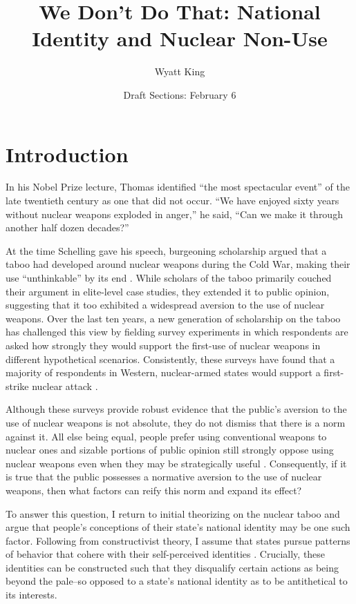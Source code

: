 \documentclass[12pt]{article}
\title{We Don't Do That: National Identity and Nuclear Non-Use}
\author{Wyatt King}
\date{Draft Sections: February 6}
\begin{document}
\maketitle


\section{Introduction}
In his Nobel Prize lecture, Thomas \citet{schelling_astonishing_2006} identified “the most spectacular event” of the late twentieth century as one that did not occur. “We have enjoyed sixty years without nuclear weapons exploded in anger,” he said, “Can we make it through another half dozen decades?”

At the time Schelling gave his speech, burgeoning scholarship argued that a taboo had developed around nuclear weapons during the Cold War, making their use “unthinkable” by its end \citep{tannenwald_stigmatizing_2005, paul_nuclear_1995}. While scholars of the taboo primarily couched their argument in elite-level case studies, they extended it to public opinion, suggesting that it too exhibited a widespread aversion to the use of nuclear weapons. Over the last ten years, a new generation of scholarship on the taboo has challenged this view by fielding survey experiments in which respondents are asked how strongly they would support the first-use of nuclear weapons in different hypothetical scenarios. Consistently, these surveys have found that a majority of respondents in Western, nuclear-armed states would support a first-strike nuclear attack \citep{sagan_revisiting_2017, haworth_what_2019,allison_under_2022, dill_kettles_2022}.

Although these surveys provide robust evidence that the public's aversion to the use of nuclear weapons is not absolute, they do not dismiss that there is a norm against it. All else being equal, people prefer using conventional weapons to nuclear ones and sizable portions of public opinion still strongly oppose using nuclear weapons even when they may be strategically useful \citep{press_atomic_2013}. Consequently, if it is true that the public possesses a normative aversion to the use of nuclear weapons, then what factors can reify this norm and expand its effect?

To answer this question, I return to initial theorizing on the nuclear taboo and argue that people's conceptions of their state's national identity may be one such factor. Following from constructivist theory, I assume that states pursue patterns of behavior that cohere with their self-perceived identities \citep{tannewald_nuclear_2007,wendt_social_1999}. Crucially, these identities can be constructed such that they disqualify certain actions as being beyond the pale--so opposed to a state's national identity as to be antithetical to its interests.
\end{document}
